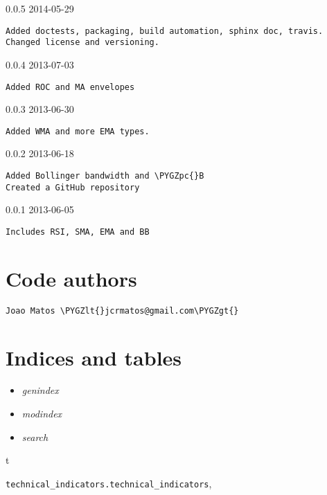 \documentclass[letterpaper,10pt,english]{sphinxmanual}
\def\PYGZlt{\char`\<}
\def\PYGZgt{\char`\>}
\def\PYGZpc{\char`\%}
\begin{document}
0.0.5 2014-05-29

\begin{Verbatim}[commandchars=\\\{\}]
Added doctests, packaging, build automation, sphinx doc, travis.
Changed license and versioning.
\end{Verbatim}

0.0.4 2013-07-03

\begin{Verbatim}[commandchars=\\\{\}]
Added ROC and MA envelopes
\end{Verbatim}

0.0.3 2013-06-30

\begin{Verbatim}[commandchars=\\\{\}]
Added WMA and more EMA types.
\end{Verbatim}

0.0.2 2013-06-18

\begin{Verbatim}[commandchars=\\\{\}]
Added Bollinger bandwidth and \PYGZpc{}B
Created a GitHub repository
\end{Verbatim}

0.0.1 2013-06-05

\begin{Verbatim}[commandchars=\\\{\}]
Includes RSI, SMA, EMA and BB
\end{Verbatim}


\chapter{Code authors}
\label{codeauthors:code-authors}\label{codeauthors::doc}
\begin{Verbatim}[commandchars=\\\{\}]
Joao Matos \PYGZlt{}jcrmatos@gmail.com\PYGZgt{}
\end{Verbatim}


\chapter{Indices and tables}
\label{index:indices-and-tables}\begin{itemize}
\item {} 
\emph{genindex}

\item {} 
\emph{modindex}

\item {} 
\emph{search}

\end{itemize}


\renewcommand{\indexname}{Python Module Index}
\begin{theindex}
\def\bigletter#1{{\Large\sffamily#1}\nopagebreak\vspace{1mm}}
\bigletter{t}
\item {\texttt{technical\_indicators.technical\_indicators}}, \pageref{reference:module-technical_indicators.technical_indicators}
\end{theindex}

\renewcommand{\indexname}{Index}
\printindex
\end{document}
